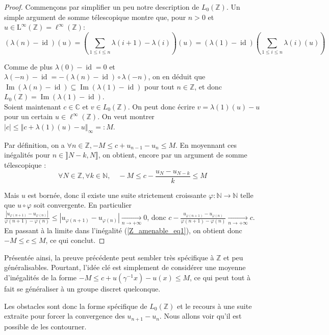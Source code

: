 \documentclass[a4paper,12pt]{article}
\newcommand{\N}{\mathbb{N}}
\newcommand{\Z}{\mathbb{Z}}
\newcommand{\C}{\mathbb{C}}
\newcommand{\norm}[1]{\left\Vert #1\right\Vert}
\newcommand{\abs}[1]{\left\vert#1\right\vert}
\newcommand{\inv}{^{-1}}
\newcommand{\comp}{\circ}
\DeclareMathOperator{\id}{id}
\DeclareMathOperator{\Ima}{Im}
\begin{document}
\begin{proof}
    Commençons par simplifier un peu notre description de $L_0(\Z)$. Un simple argument de somme
    télescopique montre que, pour $n>0$ et $u\in\mathrm{L}^\infty(\Z)=\ell^\infty(\Z)$:
    \begin{equation*}
        (\lambda(n)-\id)(u) = \left(\sum_{1\le i\le n} \lambda(i+1) - \lambda(i)\right)(u) = (\lambda(1)-\id)\left(\sum_{1\le i\le n} \lambda(i)(u)\right)
    \end{equation*}

    Comme de plus $\lambda(0)-\id = 0$ et $\lambda(-n)-\id = -(\lambda(n)-\id)\comp\lambda(-n)$,
    on en déduit que $\Ima(\lambda(n)-\id)\subseteq\Ima(\lambda(1)-\id)$ pour tout $n\in\Z$, et donc $L_0(\Z) = \Ima(\lambda(1)-\id)$. \\

    Soient maintenant $c\in\C$ et $v\in L_0(\Z)$. On peut donc écrire $v = \lambda(1)(u)-u$ pour un certain $u\in\ell^\infty(\Z)$. 
    On veut montrer $\abs{c}\le\norm{c + \lambda(1)(u) - u}_\infty =: M$. 

    Par définition, on a $\forall n\in\Z, -M\le c+u_{n-1}-u_n\le M$. En moyennant ces inégalités pour 
    $n\in\rrbracket N-k, N\rrbracket$, on obtient, encore par un argument de somme télescopique :
    \begin{equation}\label{Z_amenable_eq1}
        \forall N\in\Z, \forall k\in\N,\quad -M\le c-\frac{u_N - u_{N-k}}{k} \le M
    \end{equation}

    Mais $u$ est bornée, donc il existe une suite strictement croissante $\varphi:\N\to\N$ telle que $u\comp\varphi$
    soit convergente. En particulier $\frac{\abs{u_{\varphi(n+1)}-u_{\varphi(n)}}}{\varphi(n+1)-\varphi(n)}\le\abs{u_{\varphi(n+1)}-u_{\varphi(n)}}\xrightarrow[n\to+\infty]{}0$, 
    donc $c-\frac{u_{\varphi(n+1)}-u_{\varphi(n)}}{\varphi(n+1)-\varphi(n)}\xrightarrow[n\to+\infty]{}c$. En passant à la limite dans l'inégalité (\ref{Z_amenable_eq1}),
    on obtient donc $-M\le c\le M$, ce qui conclut.
\end{proof}

Présentée ainsi, la preuve précédente peut sembler très spécifique à $\Z$ et peu généralisables. Pourtant, l'idée clé 
est simplement de considérer une \og{}moyenne\fg{} d'inégalités de la forme $-M\le c + u(\gamma\inv x) - u(x)\le M$, 
ce qui peut tout à fait se généraliser à un groupe discret quelconque. 

Les obstacles sont donc la forme spécifique de $L_0(\Z)$ et le recours à une suite extraite pour forcer la convergence des $u_{n+1}-u_n$. Nous allons voir 
qu'il est possible de les contourner.
\end{document}
